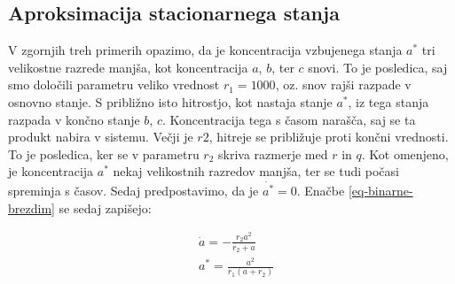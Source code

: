 \documentclass[slovene,11pt,a4paper]{article}
\numberwithin{equation}{section} %
\numberwithin{figure}{section} %
\numberwithin{table}{section} %
\begin{document}
\subsection{Aproksimacija stacionarnega stanja}
V zgornjih treh primerih opazimo, da je koncentracija vzbujenega stanja $a^*$ tri velikostne razrede manjša, kot koncentracija $a$, $b$, ter $c$ snovi. To je posledica, saj smo določili parametru veliko vrednost $r_1=1000$, oz. snov rajši razpade v osnovno stanje. S približno isto hitrostjo, kot nastaja stanje $a^*$, iz tega stanja razpada v končno stanje $b$, $c$. Koncentracija tega s časom narašča, saj se ta produkt nabira v sistemu. Večji je $r2$, hitreje se približuje proti končni vrednosti. To je posledica, ker se v parametru $r_2$ skriva razmerje med $r$ in $q$. Kot omenjeno, je koncentracija $a^*$ nekaj velikostnih razredov manjša, ter se tudi počasi spreminja s časov. Sedaj predpostavimo, da je $\dot{a^*}=0$. Enačbe \ref{eq-binarne-brezdim} se sedaj zapišejo:

\begin{equation}
\label{eq-binarne-stacio-brezdim}
\begin{aligned}
& \dot{a}= - \frac{r_2 a^2}{r_2 + a}\\
&  a^* = \frac{a^2}{r_1 (a+ r_2)}
\end{aligned}
\end{equation}
\end{document}
